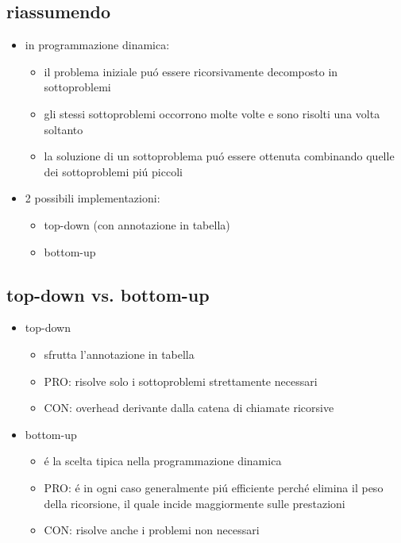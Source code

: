 \subsection*{riassumendo}
\begin{flushleft}
	\begin{itemize}
		\item in programmazione dinamica:
		\begin{itemize}
			\item il problema iniziale pu\'o essere ricorsivamente decomposto in sottoproblemi
			\item gli stessi sottoproblemi occorrono molte volte e sono risolti una volta soltanto
			\item la soluzione di un sottoproblema pu\'o essere ottenuta combinando quelle dei sottoproblemi pi\'u piccoli
		\end{itemize}
		\item 2 possibili implementazioni:
		\begin{itemize}
			\item top-down (con annotazione in tabella)
			\item bottom-up
		\end{itemize}
	\end{itemize}
\end{flushleft}


\subsection*{top-down vs. bottom-up}
\begin{flushleft}
	\begin{itemize}
		\item top-down
		\begin{itemize}
			\item sfrutta l'annotazione in tabella
			\item PRO: risolve solo i sottoproblemi strettamente necessari
			\item CON: overhead derivante dalla catena di chiamate ricorsive
		\end{itemize}
		\item bottom-up
		\begin{itemize}
			\item \'e la scelta tipica nella programmazione dinamica
			\item PRO: \'e in ogni caso generalmente pi\'u efficiente perch\'e elimina il peso della ricorsione, il quale incide maggiormente sulle prestazioni
			\item CON: risolve anche i problemi non necessari
		\end{itemize}
	\end{itemize}
\end{flushleft}

